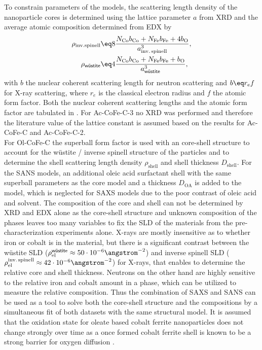 \documentclass[\main/dresen_thesis.tex]{subfiles}
\begin{document}
    To constrain parameters of the models, the scattering length density of the nanoparticle cores is determined using the lattice parameter $a$ from XRD and the average atomic composition determined from EDX by
    \begin{align}
      \label{eq:monolayer:charMethod:calcSLD}
      \rho_\mathrm{inv. spinell} &\eq 8 \frac{N_\mathrm{Co} b_\mathrm{Co} + N_\mathrm{Fe} b_\mathrm{Fe} + 4 b_\mathrm{O}}{a_\mathrm{inv.\,spinell}^3},\\
      \rho_\textsf{w\"ustite}    &\eq 4 \frac{N_\mathrm{Co} b_\mathrm{Co} + N_\mathrm{Fe} b_\mathrm{Fe} + b_\mathrm{O}}{a_\textsf{w\"ustite}^3},
    \end{align}
    with $b$ the nuclear coherent scattering length for neutron scattering and $b \eq r_e f$ for X-ray scattering, where $r_e$ is the classical electron radius and $f$ the  atomic form factor.
    Both the nuclear coherent scattering lengths and the atomic form factor are tabulated in .
    For Ac-CoFe-C-3 no XRD was performed and therefore the literature value of the lattice constant is assumed based on the results for Ac-CoFe-C and Ac-CoFe-C-2.
    \\

    For Ol-CoFe-C the superball form factor is used with an core-shell structure to account for the w\"ustite / inverse spinell structure of the particles and to determine the shell scattering length density $\rho_\mathrm{shell}$ and shell thickness $D_\mathrm{shell}$.
    For the SANS models, an additional oleic acid surfactant shell with the same superball parameters as the core model and a thickness $D_\mathrm{OA}$ is added to the model, which is neglected for SAXS models due to the poor contrast of oleic acid and solvent.
    The composition of the core and shell can not be determined by XRD and EDX alone as the core-shell structure and unknown composition of the phases leaves too many variables to fix the SLD of the materials from the pre-characterization experiments alone.
    X-rays are mostly insensitive as to whether iron or cobalt is in the material, but there is a significant contrast between the w\"ustite SLD ($\rho_\mathrm{el}^\textsf{w\"ustite} \approx 50 \cdot 10^{-6} \angstrom^{-2}$) and inverse spinell SLD ($\rho_\mathrm{el}^\mathrm{inv.\, spinell} \approx 42 \cdot 10^{-6} \angstrom^{-2}$) for X-rays, that enables to determine the relative core and shell thickness.
    Neutrons on the other hand are highly sensitive to the relative iron and cobalt amount in a phase, which can be utilized to measure the relative composition.
    Thus the combination of SAXS and SANS can be used as a tool to solve both the core-shell structure and the compositions by a simultaneous fit of both datasets with the same structural model.
    It is assumed that the oxidation state for oleate based cobalt ferrite nanoparticles does not change strongly over time as a once formed cobalt ferrite shell is known to be a strong barrier for oxygen diffusion \cite{Chen_2015_Synth}.
\end{document}
